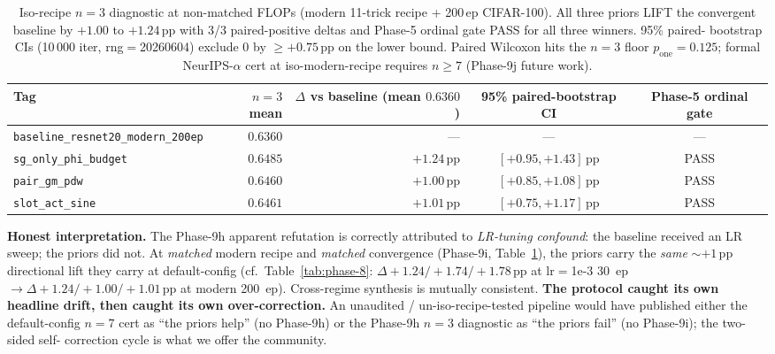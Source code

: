 \documentclass{article}
\begin{document}
\begin{table}[t]
\small\centering
\caption{Iso-recipe $n{=}3$ diagnostic at non-matched FLOPs (modern 11-trick
recipe + 200\,ep CIFAR-100). All three priors LIFT the convergent
baseline by $+1.00$ to $+1.24$\,pp with 3/3 paired-positive deltas and
Phase-5 ordinal gate PASS for all three winners. 95\% paired-
bootstrap CIs (10\,000 iter, rng$=$20260604) exclude $0$ by
$\geq{+}0.75$\,pp on the lower bound. Paired Wilcoxon hits the
$n{=}3$ floor $p_{\mathrm{one}}{=}0.125$; formal NeurIPS-$\alpha$
cert at iso-modern-recipe requires $n{\geq}7$ (Phase-9j future work).}
\label{tab:phase-9i}
\begin{tabular}{l r r c c}
\toprule
Tag & $n{=}3$ mean & $\Delta$ vs baseline (mean $0.6360$) & 95\% paired-bootstrap CI & Phase-5 ordinal gate \\
\midrule
\texttt{baseline\_resnet20\_modern\_200ep} & $0.6360$ & --- & --- & --- \\
\texttt{sg\_only\_phi\_budget}             & $0.6485$ & $+1.24$\,pp & $[+0.95, +1.43]$\,pp & PASS \\
\texttt{pair\_gm\_pdw}                     & $0.6460$ & $+1.00$\,pp & $[+0.85, +1.08]$\,pp & PASS \\
\texttt{slot\_act\_sine}                   & $0.6461$ & $+1.01$\,pp & $[+0.75, +1.17]$\,pp & PASS \\
\bottomrule
\end{tabular}
\end{table}

\textbf{Honest interpretation.} The Phase-9h apparent refutation is
correctly attributed to \emph{LR-tuning confound}: the baseline
received an LR sweep; the priors did not. At \emph{matched} modern
recipe and \emph{matched} convergence (Phase-9i, Table~\ref{tab:phase-9i}),
the priors carry the \emph{same} ${\sim}{+1}$\,pp directional lift
they carry at default-config (cf.\
Table~\ref{tab:phase-8}: $\Delta {+}1.24 / {+}1.74 /
{+}1.78$\,pp at lr$=$1e-3 30~ep $\to \Delta {+}1.24 / {+}1.00 /
{+}1.01$\,pp at modern 200~ep). Cross-regime synthesis is mutually
consistent. \textbf{The protocol caught its own headline drift, then
caught its own over-correction.} An unaudited / un-iso-recipe-tested
pipeline would have published either the default-config $n{=}7$ cert
as ``the priors help'' (no Phase-9h) or the Phase-9h $n{=}3$
diagnostic as ``the priors fail'' (no Phase-9i); the two-sided self-
correction cycle is what we offer the community.

\end{document}

